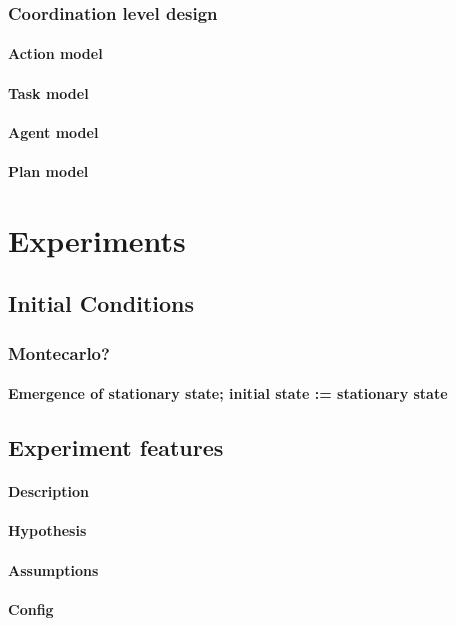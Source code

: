 \documentclass{report}
\begin{document}
			\subsubsection{Coordination level design}
				\paragraph{Action model}
				\paragraph{Task model}
				\paragraph{Agent model}
				\paragraph{Plan model}	
	\section{Experiments}	
		\subsection{Initial Conditions}
			\subsubsection{Montecarlo?} 
			\paragraph{Emergence of stationary state; initial state := stationary state}
		\subsection{Experiment features}
			\paragraph{Description}
			\paragraph{Hypothesis}
			\paragraph{Assumptions}
			\paragraph{Config}
\end{document}

